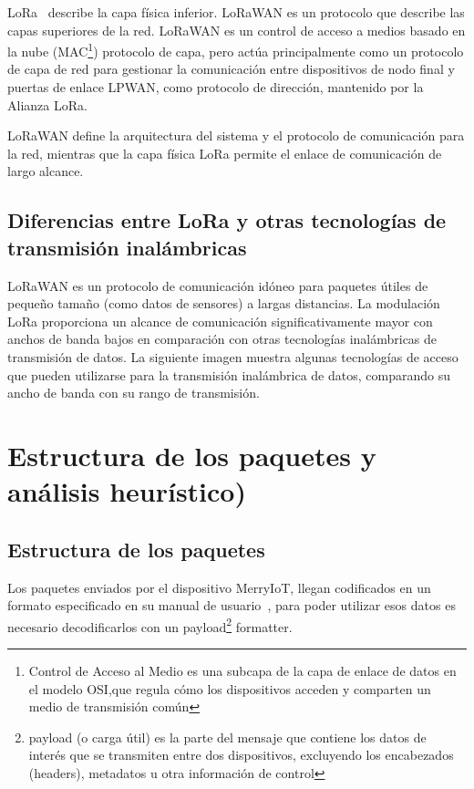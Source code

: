 LoRa~\cite{Moko:Lora} describe la capa física inferior. LoRaWAN es un protocolo que describe las capas superiores de la red. LoRaWAN es un control de acceso a medios basado en la nube (MAC\footnote{Control de Acceso al Medio es una subcapa de la capa de enlace de datos en el modelo OSI,que regula cómo los dispositivos acceden y comparten un medio de transmisión común}) protocolo de capa, pero actúa principalmente como un protocolo de capa de red para gestionar la comunicación entre dispositivos de nodo final y puertas de enlace LPWAN, como protocolo de dirección, mantenido por la Alianza LoRa.

LoRaWAN define la arquitectura del sistema y el protocolo de comunicación para la red, mientras que la capa física LoRa permite el enlace de comunicación de largo alcance.


\subsection{Diferencias entre LoRa y otras tecnologías de transmisión inalámbricas}
LoRaWAN es un protocolo de comunicación idóneo para paquetes útiles de pequeño tamaño (como datos de sensores) a largas distancias. La modulación LoRa proporciona un alcance de comunicación significativamente mayor con anchos de banda bajos en comparación con otras tecnologías inalámbricas de transmisión de datos. La siguiente imagen muestra algunas tecnologías de acceso que pueden utilizarse para la transmisión inalámbrica de datos, comparando su ancho de banda con su rango de transmisión.



\section{Estructura de los paquetes y análisis heurístico)}

\subsection{Estructura de los paquetes}
Los paquetes enviados por el dispositivo MerryIoT, llegan codificados en un formato especificado en su manual de usuario~\cite{MerryIoT:manual}, para poder utilizar esos datos es necesario decodificarlos con un payload\footnote{ payload (o carga útil) es la parte del mensaje que contiene los datos de interés que se transmiten entre dos dispositivos, excluyendo los encabezados (headers), metadatos u otra información de control} formatter.

